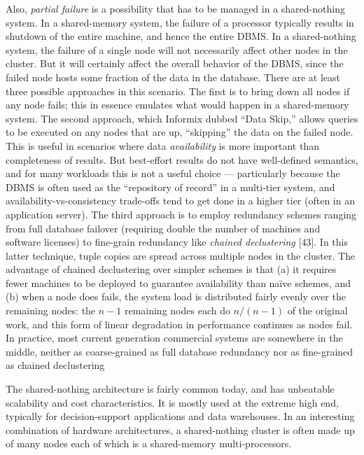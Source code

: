 \documentclass[a4paper,11pt,twoside,openright]{book}
\begin{document}
Also, \emph{partial failure} is a possibility that has to be managed in
a shared-nothing system. In a shared-memory system, the failure of a
processor typically results in shutdown of the entire machine, and hence
the entire DBMS. In a shared-nothing system, the failure of a single
node will not necessarily affect other nodes in the cluster. But it will
certainly affect the overall behavior of the DBMS, since the failed node
hosts some fraction of the data in the database. There are at least
three possible approaches in this scenario. The first is to bring down
all nodes if any node fails; this in essence emulates what would happen
in a shared-memory system. The second approach, which Informix dubbed
``Data Skip,'' allows queries to be executed on any nodes that are up,
``skipping'' the data on the failed node. This is useful in scenarios
where data \emph{availability} is more important than completeness of
results. But best-effort results do not have well-defined semantics, and
for many workloads this is not a useful choice --- particularly because
the DBMS is often used as the ``repository of record'' in a multi-tier
system, and availability-vs-consistency trade-offs tend to get done in a
higher tier (often in an application server). The third approach is to
employ redundancy schemes ranging from full database failover (requiring
double the number of machines and software licenses) to fine-grain
redundancy like \emph{chained declustering} {[}43{]}. In this latter
technique, tuple copies are spread across multiple nodes in the cluster.
The advantage of chained declustering over simpler schemes is that (a)
it requires fewer machines to be deployed to guarantee availability than
na\"ive schemes, and (b) when a node does fails, the system load is
distributed fairly evenly over the remaining nodes: the $n - 1$
remaining nodes each do $n / (n - 1)$ of the
original work, and this form of linear degradation in performance
continues as nodes fail. In practice, most current generation commercial
systems are somewhere in the middle, neither as coarse-grained as full
database redundancy nor as fine-grained as chained declustering

The shared-nothing architecture is fairly common today, and has
unbeatable scalability and cost characteristics. It is mostly used at
the extreme high end, typically for decision-support applications and
data warehouses. In an interesting combination of hardware
architectures, a shared-nothing cluster is often made up of many nodes
each of which is a shared-memory multi-processors.
\end{document}
